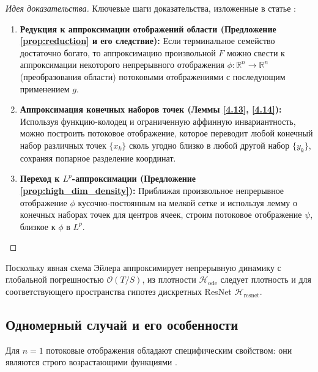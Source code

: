 \documentclass[../NDCNNAI_main.tex]{subfiles}
\begin{document}
\begin{proof}[Идея доказательства]
Ключевые шаги доказательства, изложенные в статье \cite[Раздел 4]{Li2023DeepLD}:
\begin{enumerate}
    \item \textbf{Редукция к аппроксимации отображений области (Предложение \ref{prop:reduction} и его следствие):} Если терминальное семейство достаточно богато, то аппроксимацию произвольной $F$ можно свести к аппроксимации некоторого непрерывного отображения $\phi: \mathbb{R}^n \to \mathbb{R}^n$ (преобразования области) потоковыми отображениями с последующим применением $g$.
    \item \textbf{Аппроксимация конечных наборов точек (Леммы \ref{4.13}, \ref{4.14}):} Используя функцию-колодец и ограниченную аффинную инвариантность, можно построить потоковое отображение, которое переводит любой конечный набор различных точек $\{x_k\}$ сколь угодно близко в любой другой набор $\{y_k\}$, сохраняя попарное разделение координат.
    \item \textbf{Переход к $L^p$-аппроксимации (Предложение \ref{prop:high_dim_density}):} Приближая произвольное непрерывное отображение $\phi$ кусочно-постоянным на мелкой сетке и используя лемму о конечных наборах точек для центров ячеек, строим потоковое отображение $\psi$, близкое к $\phi$ в $L^p$.
\end{enumerate}
\end{proof}

\begin{corollary}
    Поскольку явная схема Эйлера аппроксимирует непрерывную динамику с глобальной погрешностью $\mathcal{O}(T/S)$, из плотности $\mathcal{H}_{\text{ode}}$ следует плотность и для соответствующего пространства гипотез дискретных ResNet $\mathcal{H}_{\text{resnet}}$.
\end{corollary}

\subsection{Одномерный случай и его особенности}

Для $n=1$ потоковые отображения обладают специфическим свойством: они являются строго возрастающими функциями \cite[Предложение 3.4]{Li2023DeepLD}.
\end{document}
